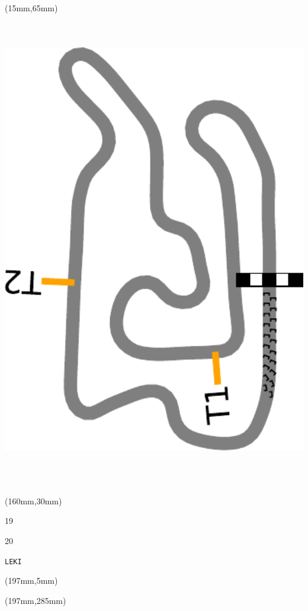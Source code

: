 \begin{textblock*}{185mm}(15mm,65mm)%
\centering
\mbox{\includegraphics[width=185mm,height=210mm,keepaspectratio]{PT/LEKI.pdf}}
\end{textblock*}
\begin{textblock*}{40mm}(160mm,30mm)%
\Large
\par{} 
\par19 
\par20 
\par\hfill\tiny\tt LEKI\\
\end{textblock*}
\begin{textblock*}{20mm}(197mm,5mm)%
\fbox{\thepage}
\label{LEKI}
\end{textblock*}
\begin{textblock*}{20mm}(197mm,285mm)%
\fbox{\thepage}
\end{textblock*}

